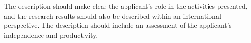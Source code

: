 \documentclass[12pt]{article}
\begin{document}
\begin{center}
{\Large{}}
\end{center}

The description should make clear the applicant’s role in the
activities presented, and the research results should also be
described within an international perspective. The description should
include an assessment of the applicant’s independence and
productivity.
\end{document}
